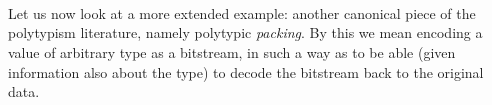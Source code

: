 \documentclass[fleqn,runningheads]{llncs}
\begin{document}
\begin{code}[hide]%
\>[0]\AgdaSpace{}%
\AgdaSpace{}%
\<%
\\
\>[0][@{}l@{\AgdaIndent{0}}]%
\>[2]\AgdaSpace{}%
\AgdaSpace{}%
\<%
\\
%
\>[2]\AgdaSpace{}%
\AgdaSymbol{:}\AgdaSpace{}%
\AgdaSpace{}%
\AgdaSpace{}%
\AgdaSpace{}%
\<%
\\
%
\>[2]\AgdaSpace{}%
\AgdaSpace{}%
\AgdaSymbol{=}\AgdaSpace{}%
\<%
\\
%
\>[2]\AgdaSpace{}%
\AgdaSymbol{(}\AgdaSpace{}%
\AgdaSymbol{)}\AgdaSpace{}%
\AgdaSymbol{=}\AgdaSpace{}%
\<%
\\
%
\>[2]\AgdaSpace{}%
\AgdaSymbol{:}\AgdaSpace{}%
\AgdaSpace{}%
\AgdaSpace{}%
\AgdaSpace{}%
\AgdaSpace{}%
\<%
\\
%
\>[2]\AgdaSpace{}%
\AgdaSpace{}%
\AgdaSpace{}%
\AgdaSpace{}%
\AgdaSpace{}%
\<%
\\
%
\>[2]\AgdaSpace{}%
\AgdaSymbol{|}\AgdaSpace{}%
\AgdaSpace{}%
\AgdaSpace{}%
\AgdaSpace{}%
\AgdaSpace{}%
\AgdaSymbol{=}\AgdaSpace{}%
\AgdaSymbol{(}\AgdaSpace{}%
\AgdaOperator{\AgdaInductiveConstructor{,}}\AgdaSpace{}%
\AgdaSpace{}%
\AgdaSymbol{)}\<%
\\
\>[0]\AgdaSpace{}%
\AgdaSpace{}%
\<%
\end{code}

Let us now look at a more extended example: another canonical piece of the polytypism literature, namely polytypic \emph{packing}. By this we mean encoding a value of arbitrary type as a bitstream, in such a way as to be able (given information also about the type) to decode the bitstream back to the original data.
\end{document}
